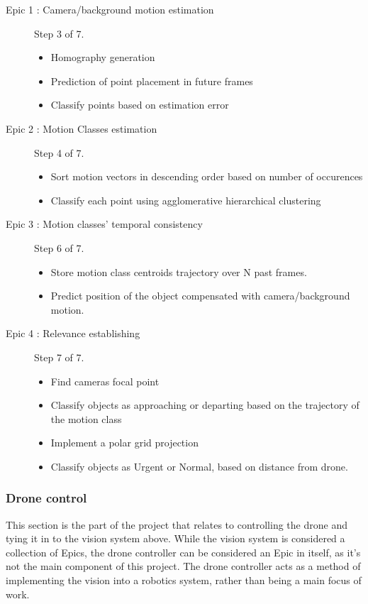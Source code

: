 \begin{description}
	\item[Epic 1 : Camera/background motion estimation] Step 3 of 7.\\
	\vspace{-15pt}
	\begin{itemize}
		\item Homography generation
		\item Prediction of point placement in future frames
		\item Classify points based on estimation error
	\end{itemize}
	\item[Epic 2 : Motion Classes estimation] Step 4 of 7.\\
	\vspace{-15pt}
	\begin{itemize}
		\item Sort motion vectors in descending order based on number of occurences
		\item Classify each point using agglomerative hierarchical clustering
	\end{itemize}
	\item[Epic 3 : Motion classes' temporal consistency] Step 6 of 7.\\
	\vspace{-15pt}
	\begin{itemize}
		\item Store motion class centroids trajectory over N past frames.
		\item Predict position of the object compensated with camera/background motion.
	\end{itemize}
	\clearpage
	\item[Epic 4 : Relevance establishing] Step 7 of 7.\\
	\vspace{-15pt}
	\begin{itemize}
		\item Find cameras focal point
		\item Classify objects as approaching or departing based on the trajectory of the motion class
		\item Implement a polar grid projection
		\item Classify objects as Urgent or Normal, based on distance from drone.
	\end{itemize}
\end{description}

\subsubsection{Drone control}
This section is the part of the project that relates to controlling the drone and tying it in to the vision system above. While the vision system is considered a collection of Epics, the drone controller can be considered an Epic in itself, as it's not the main component of this project. The drone controller acts as a method of implementing the vision into a robotics system, rather than being a main focus of work.

